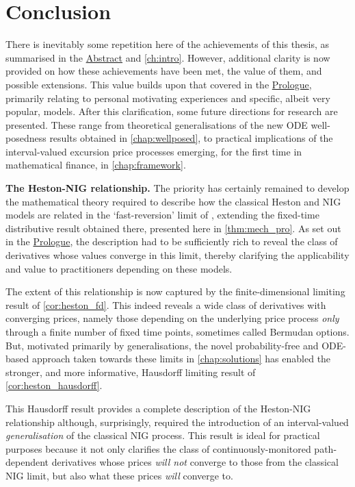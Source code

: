 \clearpage
\section{Conclusion}\label{chap:conclusion}

There is inevitably some repetition here of the achievements of this thesis, as summarised in the \hyperlink{abstract}{Abstract} and \autoref{ch:intro}. However, additional clarity is now provided on how these achievements have been met, the value of them, and possible extensions. This value builds upon that covered in the \hyperlink{prologue}{Prologue}, primarily relating to personal motivating experiences and specific, albeit very popular, models. After this clarification, some future directions for research are presented. These range from theoretical generalisations of the new ODE well-posedness results obtained in \autoref{chap:wellposed}, to practical implications of the interval-valued excursion price processes emerging, for the first time in mathematical finance, in \autoref{chap:framework}.

\vspace{3mm}\textbf{The Heston-NIG relationship.} The priority has certainly remained to develop the mathematical theory required to describe how the classical Heston and NIG models are related in the `fast-reversion' limit of \cite{mechkov_2015}, extending the fixed-time distributive result obtained there, presented here in \autoref{thm:mech_pro}. As set out in the \hyperlink{prologue}{Prologue}, the description had to be sufficiently rich to reveal the class of derivatives whose values converge in this limit, thereby clarifying the applicability and value to practitioners depending on these models.

The extent of this relationship is now captured by the finite-dimensional limiting result of \autoref{cor:heston_fd}. This indeed reveals a wide class of derivatives with converging prices, namely those depending on the underlying price process \emph{only} through a finite number of fixed time points, sometimes called Bermudan options. But, motivated primarily by generalisations, the novel probability-free and ODE-based approach taken towards these limits in \autoref{chap:solutions} has enabled the stronger, and more informative, Hausdorff limiting result of \autoref{cor:heston_hausdorff}.

This Hausdorff result provides a complete description of the Heston-NIG relationship although, surprisingly, required the introduction of an interval-valued \emph{generalisation} of the classical NIG process. This result is ideal for practical purposes because it not only clarifies the class of continuously-monitored path-dependent derivatives whose prices \emph{will not} converge to those from the classical NIG limit, but also what these prices \emph{will} converge to.

